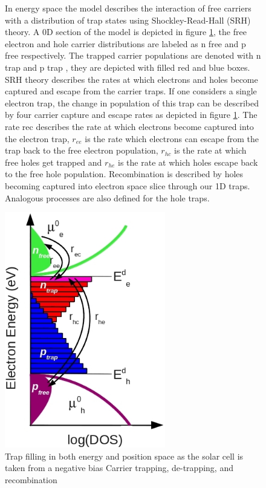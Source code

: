 \documentclass[11pt]{article}
\begin{document}
\begin{figure}
In energy space the model describes the interaction of free carriers with a distribution of trap states using Shockley-Read-Hall (SRH) theory. A 0D section of the model is depicted in figure \ref{fig:dos_structure}, the free electron and hole carrier distributions are labeled as n free and p free respectively. The trapped carrier populations are denoted with n trap and p trap , they are depicted with filled red and blue boxes. SRH theory describes the rates at which electrons and holes become captured and escape from the carrier traps. If one considers a single electron trap, the change in population of this trap can be described by four carrier capture and escape rates as depicted in figure \ref{fig:dos_structure}. The rate rec describes the rate at which electrons become captured into the electron trap, $r_{ee}$ is the rate which electrons can escape from the trap back to the free electron population, $r_{hc}$ is the rate at which free holes get trapped and $r_{he}$ is the rate at which holes escape back to the free hole population. Recombination is described by holes becoming captured into electron space slice through our 1D traps. Analogous processes are also defined for the hole traps.

\centering
\includegraphics[width=70mm]{./images/dos_structure.jpg}
\caption{Trap filling in both energy and position space as the solar cell is taken from a negative bias
Carrier trapping, de-trapping, and recombination}
\label{fig:dos_structure}
\end{figure}
\end{document}
